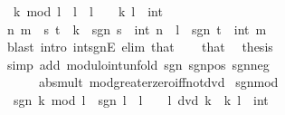 \begin{isabellebody}
\ \ {\isachardoublequoteopen}{\isasymbar}k\ mod\ l{\isasymbar}\ {\isacharless}{\kern0pt}\ {\isasymbar}l{\isasymbar}{\isachardoublequoteclose}\ \ {\isachardoublequoteopen}l\ {\isasymnoteq}\ {}{\isachardoublequoteclose}\ \ k\ l\ {\isacharcolon}{\kern0pt}{\isacharcolon}{\kern0pt}\ int\isanewline
%
\isadelimproof
%
\endisadelimproof
%
\isatagproof
{}\isamarkupfalse%
\ {\isacharminus}{\kern0pt}\isanewline
\ \ \isamarkupfalse%
\ n\ m\ \ s\ t\ \ {\isachardoublequoteopen}k\ {\isacharequal}{\kern0pt}\ sgn\ s\ {\isacharasterisk}{\kern0pt}\ int\ n{\isachardoublequoteclose}\ \ {\isachardoublequoteopen}l\ {\isacharequal}{\kern0pt}\ sgn\ t\ {\isacharasterisk}{\kern0pt}\ int\ m{\isachardoublequoteclose}\ \isanewline
\ \ \ \ \isamarkupfalse%
\ {\isacharparenleft}{\kern0pt}blast\ intro{\isacharcolon}{\kern0pt}\ int{\isacharunderscore}{\kern0pt}sgnE\ elim{\isacharcolon}{\kern0pt}\ that{\isacharparenright}{\kern0pt}\isanewline
\ \ \isamarkupfalse%
\ that\ \isamarkupfalse%
\ {\isacharquery}{\kern0pt}thesis\isanewline
\ \ \ \ \isamarkupfalse%
\ {\isacharparenleft}{\kern0pt}simp\ add{\isacharcolon}{\kern0pt}\ modulo{\isacharunderscore}{\kern0pt}int{\isacharunderscore}{\kern0pt}unfold\ sgn{\isacharunderscore}{\kern0pt}{}{\isacharunderscore}{\kern0pt}{}\ sgn{\isacharunderscore}{\kern0pt}{}{\isacharunderscore}{\kern0pt}pos\ sgn{\isacharunderscore}{\kern0pt}{}{\isacharunderscore}{\kern0pt}neg\isanewline
\ \ \ \ \ \ abs{\isacharunderscore}{\kern0pt}mult\ mod{\isacharunderscore}{\kern0pt}greater{\isacharunderscore}{\kern0pt}zero{\isacharunderscore}{\kern0pt}iff{\isacharunderscore}{\kern0pt}not{\isacharunderscore}{\kern0pt}dvd{\isacharparenright}{\kern0pt}\isanewline
{}\isamarkupfalse%
%
\endisatagproof
{\isafoldproof}%
%
\isadelimproof
\isanewline
%
\endisadelimproof
\isanewline
{}\isamarkupfalse%
\ sgn{\isacharunderscore}{\kern0pt}mod{\isacharcolon}{\kern0pt}\isanewline
\ \ {\isachardoublequoteopen}sgn\ {\isacharparenleft}{\kern0pt}k\ mod\ l{\isacharparenright}{\kern0pt}\ {\isacharequal}{\kern0pt}\ sgn\ l{\isachardoublequoteclose}\ \ {\isachardoublequoteopen}l\ {\isasymnoteq}\ {}{\isachardoublequoteclose}\ {\isachardoublequoteopen}{\isasymnot}\ l\ dvd\ k{\isachardoublequoteclose}\ \ k\ l\ {\isacharcolon}{\kern0pt}{\isacharcolon}{\kern0pt}\ int\isanewline
%
\isadelimproof
%

\end{isabellebody}
